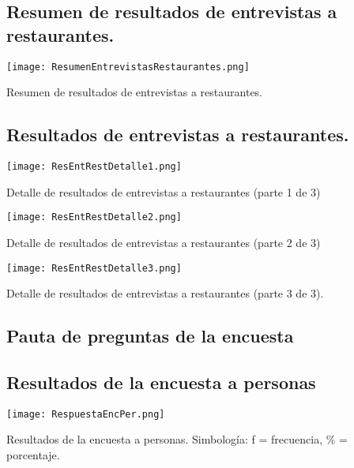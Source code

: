\newpage
\subsection{Resumen de resultados de entrevistas a restaurantes.}
\label{ResResEntRest}

\begin{table}[H]
\label{ResumenEntrevistasRestaurantes}
\centering
\texttt{[image: ResumenEntrevistasRestaurantes.png]}
\caption{Resumen de resultados de entrevistas a restaurantes.}
\end{table}

\newpage
\subsection{Resultados de entrevistas a restaurantes.} \label{ResEntRest}
\begin{table}[H]
\centering
\texttt{[image: ResEntRestDetalle1.png]}
\caption{Detalle de resultados de entrevistas a restaurantes (parte 1 de 3)}
\label{ResEntRestDetalle1}
\end{table}

\begin{table}[H]
\centering
\texttt{[image: ResEntRestDetalle2.png]}
\caption{Detalle de resultados de entrevistas a restaurantes (parte 2 de 3)}
\label{ResEntRestDetalle2}
\end{table}

\begin{table}[H]
\centering
\texttt{[image: ResEntRestDetalle3.png]}
\caption{Detalle de resultados de entrevistas a restaurantes (parte 3 de 3).}
\label{ResEntRestDetalle3}
\end{table}

\newpage
\subsection{Pauta de preguntas de la encuesta} \label{PauEnc}


\newpage
\subsection{Resultados de la encuesta a personas} \label{ResEncPer}

\begin{table}[H]
\centering
\texttt{[image: RespuestaEncPer.png]}
\caption{Resultados de la encuesta a personas. Simbología: f = frecuencia, \% = porcentaje.}
\label{RespuestaEncPer}
\end{table}


